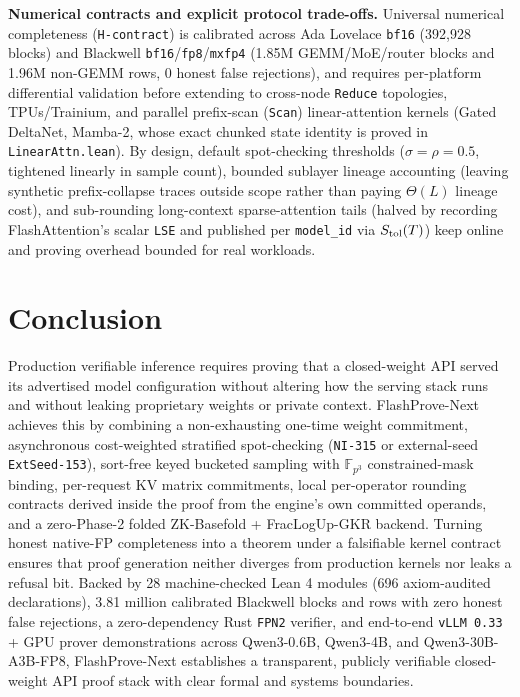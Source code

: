 \documentclass[10pt]{article}
\begin{document}
\textbf{Numerical contracts and explicit protocol trade-offs.} Universal numerical completeness (\texttt{H-contract}) is calibrated across Ada Lovelace \texttt{bf16} (392,928 blocks) and Blackwell \texttt{bf16}/\texttt{fp8}/\texttt{mxfp4} (1.85M GEMM/MoE/router blocks and 1.96M non-GEMM rows, 0 honest false rejections), and requires per-platform differential validation before extending to cross-node \texttt{Reduce} topologies, TPUs/Trainium, and parallel prefix-scan (\texttt{Scan}) linear-attention kernels (Gated DeltaNet, Mamba-2, whose exact chunked state identity is proved in \texttt{LinearAttn.\allowbreak{}lean}). By design, default spot-checking thresholds ($\sigma=\rho=0.5$, tightened linearly in sample count), bounded sublayer lineage accounting (leaving synthetic prefix-collapse traces outside scope rather than paying $\Theta(L)$ lineage cost), and sub-rounding long-context sparse-attention tails (halved by recording FlashAttention's scalar \texttt{LSE} and published per \texttt{model\_\allowbreak{}id} via $S_{\rm tol}(T)$) keep online and proving overhead bounded for real workloads.

\section{Conclusion}
Production verifiable inference requires proving that a closed-weight API served its advertised model configuration without altering how the serving stack runs and without leaking proprietary weights or private context. FlashProve-Next achieves this by combining a non-exhausting one-time weight commitment, asynchronous cost-weighted stratified spot-checking (\texttt{NI-315} or external-seed \texttt{ExtSeed-153}), sort-free keyed bucketed sampling with $\mathbb F_{p^3}$ constrained-mask binding, per-request KV matrix commitments, local per-operator rounding contracts derived inside the proof from the engine's own committed operands, and a zero-Phase-2 folded ZK-Basefold + FracLogUp-GKR backend. Turning honest native-FP completeness into a theorem under a falsifiable kernel contract ensures that proof generation neither diverges from production kernels nor leaks a refusal bit. Backed by 28 machine-checked Lean 4 modules (696 axiom-audited declarations), 3.81 million calibrated Blackwell blocks and rows with zero honest false rejections, a zero-dependency Rust \texttt{FPN2} verifier, and end-to-end \texttt{vLLM 0.\allowbreak{}33} + GPU prover demonstrations across Qwen3-0.6B, Qwen3-4B, and Qwen3-30B-A3B-FP8, FlashProve-Next establishes a transparent, publicly verifiable closed-weight API proof stack with clear formal and systems boundaries.
\end{document}

